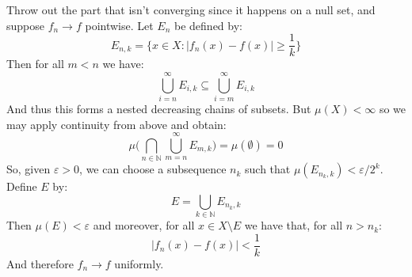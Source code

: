 \documentclass[crop=false,class=article]{standalone}                           %
\begin{document}
        \begin{solution}
            Throw out the part that isn't converging since it happens on a null set,
            and suppose $f_{n}\rightarrow{f}$ pointwise. Let $E_{n}$ be defined by:
            \begin{equation}
                E_{n,k}=\{x\in{X}:|f_{n}(x)-f(x)|\geq\frac{1}{k}\}
            \end{equation}
            Then for all $m<n$ we have:
            \begin{equation}
                \bigcup_{i=n}^{\infty}E_{i,k}\subseteq\bigcup_{i=m}^{\infty}E_{i,k}
            \end{equation}
            And thus this forms a nested decreasing chains of subsets. But
            $\mu(X)<\infty$ so we may apply continuity from above and obtain:
            \begin{equation}
                \mu\Big(\bigcap_{n\in\mathbb{N}}\bigcup_{m=n}^{\infty}E_{m,k}\Big)
                    =\mu(\emptyset)=0
            \end{equation}
            So, given $\varepsilon>0$, we can choose a subsequence $n_{k}$ such that
            $\mu(E_{n_{k},k})<\varepsilon/2^{k}$. Define $E$ by:
            \begin{equation}
                E=\bigcup_{k\in\mathbb{N}}E_{n_{k},k}
            \end{equation}
            Then $\mu(E)<\varepsilon$ and moreover, for all $x\in{X}\setminus{E}$
            we have that, for all $n>n_{k}$:
            \begin{equation}
                |f_{n}(x)-f(x)|<\frac{1}{k}
            \end{equation}
            And therefore $f_{n}\rightarrow{f}$ uniformly.
        \end{solution}
\end{document}
